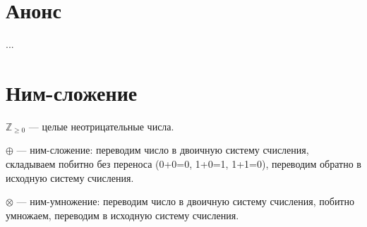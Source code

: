 \documentclass[12pt]{article}
\theoremstyle{definition}
\begin{document}
\tableofcontents{}

\section*{Анонс}
...

\newpage
\setcounter{section}{0}

\section{Ним-сложение}

$\mathbb{Z}_{\geq 0}$ — целые неотрицательные числа.

$\oplus$ — ним-сложение: переводим число в двоичную систему счисления, складываем побитно без переноса (0+0=0, 1+0=1, 1+1=0), 
переводим обратно в исходную систему счисления. 

$\otimes$ — ним-умножение: переводим число в двоичную систему счисления, побитно умножаем, 
переводим в исходную систему счисления. 
\end{document}
